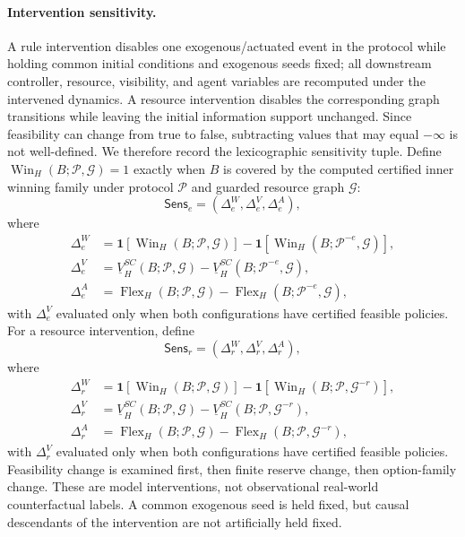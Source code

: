 \documentclass[letterpaper]{article} %
\begin{document}
\paragraph{Intervention sensitivity.}
A rule intervention disables one exogenous/actuated event in the protocol while holding common initial conditions and exogenous seeds fixed; all downstream controller, resource, visibility, and agent variables are recomputed under the intervened dynamics. A resource intervention disables the corresponding graph transitions while leaving the initial information support unchanged. Since feasibility can change from true to false, subtracting values that may equal $-\infty$ is not well-defined. We therefore record the lexicographic sensitivity tuple. Define $\operatorname{Win}_H(B;\mathcal P,\mathcal G)=1$ exactly when $B$ is covered by the computed certified inner winning family under protocol $\mathcal P$ and guarded resource graph $\mathcal G$:
\begin{equation}
\mathsf{Sens}_e=
\left(
\Delta_e^{W},\Delta_e^{V},\Delta_e^{A}
\right),
\label{eq:event-sensitivity}
\end{equation}
where
\begin{align}
\Delta_e^{W}&=
\mathbf 1[\operatorname{Win}_H(B;\mathcal P,\mathcal G)]
-\mathbf 1[\operatorname{Win}_H(B;\mathcal P^{-e},\mathcal G)],\nonumber\\
\Delta_e^{V}&=
\underline V_H^{SC}(B;\mathcal P,\mathcal G)
-\underline V_H^{SC}(B;\mathcal P^{-e},\mathcal G),\nonumber\\
\Delta_e^{A}&=
\operatorname{Flex}_H(B;\mathcal P,\mathcal G)
-\operatorname{Flex}_H(B;\mathcal P^{-e},\mathcal G),
\label{eq:event-sensitivity-components}
\end{align}
with $\Delta_e^V$ evaluated only when both configurations have certified feasible policies. For a resource intervention, define
\begin{equation}
\mathsf{Sens}_r=
(\Delta_r^W,\Delta_r^V,\Delta_r^A),
\label{eq:resource-sensitivity}
\end{equation}
where
\begin{align}
\Delta_r^W&=
\mathbf 1[\operatorname{Win}_H(B;\mathcal P,\mathcal G)]
-\mathbf 1[\operatorname{Win}_H(B;\mathcal P,\mathcal G^{-r})],\nonumber\\
\Delta_r^V&=
\underline V_H^{SC}(B;\mathcal P,\mathcal G)
-\underline V_H^{SC}(B;\mathcal P,\mathcal G^{-r}),\nonumber\\
\Delta_r^A&=
\operatorname{Flex}_H(B;\mathcal P,\mathcal G)
-\operatorname{Flex}_H(B;\mathcal P,\mathcal G^{-r}),
\end{align}
with $\Delta_r^V$ evaluated only when both configurations have certified feasible policies. Feasibility change is examined first, then finite reserve change, then option-family change. These are model interventions, not observational real-world counterfactual labels. A common exogenous seed is held fixed, but causal descendants of the intervention are not artificially held fixed.
\end{document}
